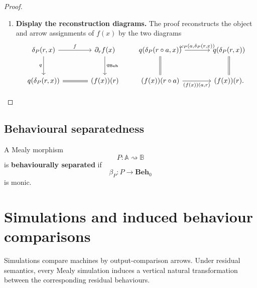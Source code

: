 \begin{proof}
\begin{enumerate}
        \item \textbf{Display the reconstruction diagrams.} The proof reconstructs the object and arrow assignments of \(f(x)\) by the two diagrams
        \[
            \begin{tikzcd}[column sep=large, row sep=large]
                    \delta_P(r,x)
                        \arrow[r, "f"]
                        \arrow[d, "q"']
                &
                    \partial_r f(x)
                        \arrow[d, "q_{\mathbf{Beh}}"]
                \\
                    q(\delta_P(r,x))
                        \arrow[r, equal]
                &
                    (f(x))(r)
            \end{tikzcd}
            \qquad
            \begin{tikzcd}[column sep=large, row sep=large]
                    q(\delta_P(r\circ a,x))
                        \arrow[r, "{\omega_P(a,\delta_P(r,x))}"]
                        \arrow[d, equal]
                &
                    q(\delta_P(r,x))
                        \arrow[d, equal]
                \\
                    (f(x))(r\circ a)
                        \arrow[r, "{(f(x))(a,r)}"']
                &
                    (f(x))(r).
            \end{tikzcd}
        \]
    \end{enumerate}
\end{proof}

\subsection{Behavioural separatedness}
\label{subsec:behavioural-separatedness}

\begin{definition}
\label{def:behavioural-separatedness}
    A Mealy morphism
    \[
        P:\mathbb A\rightsquigarrow\mathbb B
    \]
    is \textbf{behaviourally separated} if
    \[
        \beta_P:P\to\mathbf{Beh}_0
    \]
    is monic.
\end{definition}

\section{Simulations and induced behaviour comparisons}
\label{sec:simulations-and-behaviour-comparisons}

Simulations compare machines by output-comparison arrows. Under residual semantics, every Mealy simulation induces a vertical natural transformation between the corresponding residual behaviours.

